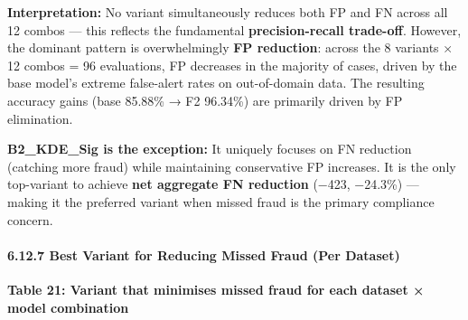 \documentclass[
  11pt,
]{article}
\begin{document}
\textbf{Interpretation:} No variant simultaneously reduces both FP and
FN across all 12 combos — this reflects the fundamental
\textbf{precision-recall trade-off}. However, the dominant pattern is
overwhelmingly \textbf{FP reduction}: across the 8 variants × 12 combos
= 96 evaluations, FP decreases in the majority of cases, driven by the
base model’s extreme false-alert rates on out-of-domain data. The
resulting accuracy gains (base 85.88\% → F2 96.34\%) are primarily
driven by FP elimination.

\textbf{B2\_KDE\_Sig is the exception:} It uniquely focuses on FN
reduction (catching more fraud) while maintaining conservative FP
increases. It is the only top-variant to achieve \textbf{net aggregate
FN reduction} (−423, −24.3\%) — making it the preferred variant when
missed fraud is the primary compliance concern.

\paragraph{6.12.7 Best Variant for Reducing Missed Fraud (Per
Dataset)}\label{best-variant-for-reducing-missed-fraud-per-dataset}

\textbf{Table 21: Variant that minimises missed fraud for each dataset ×
model combination}
\end{document}
